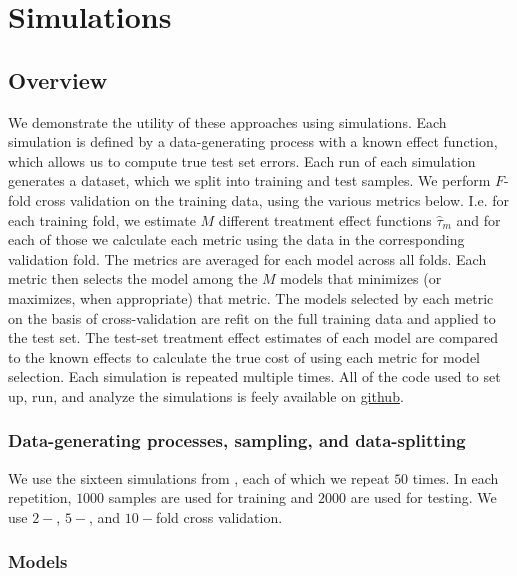 \section{Simulations}

\subsection{Overview}

We demonstrate the utility of these approaches using simulations. Each simulation is defined by a data-generating process with a known effect function, which allows us to compute true test set errors. Each run of each simulation generates a dataset, which we split into training and test samples. We perform $F$-fold cross validation on the training data, using the various metrics below. I.e. for each training fold, we estimate $M$ different treatment effect functions $\hat\tau_m$ and for each of those we calculate each metric using the data in the corresponding validation fold. The metrics are averaged for each model across all folds. Each metric then selects the model among the $M$ models that minimizes (or maximizes, when appropriate) that metric. The models selected by each metric on the basis of cross-validation are refit on the full training data and applied to the test set. The test-set treatment effect estimates of each model are compared to the known effects to calculate the true cost of using each metric for model selection. Each simulation is repeated multiple times. All of the code used to set up, run, and analyze the simulations is feely available on \href{https://github.com/som-shahlab/ITE-model-selection}{github}.

\subsubsection{Data-generating processes, sampling, and data-splitting}

We use the sixteen simulations from \citet{Powers:2017wd}, each of which we repeat $50$ times. In each repetition, $1000$ samples are used for training and $2000$ are used for testing. We use $2-$, $5-$, and $10-$fold cross validation.

\subsubsection{Models}

